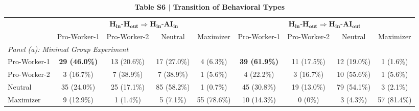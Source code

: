 \begin{table}[htbp]
\centering
\caption{\textbf{Table S6 $\vert$ Transition of Behavioral Types}}
\label{tab:transition_types}
\small
\setlength{\tabcolsep}{4pt}
\begin{tabular}{lcccccccc}
\toprule\toprule
 & \multicolumn{4}{c}{$\mathbf{H_{in}}$-$\mathbf{H_{out}} \Rightarrow \mathbf{H_{in}}$-$\mathbf{AI_{in}}$} & \multicolumn{4}{c}{$\mathbf{H_{in}}$-$\mathbf{H_{out}} \Rightarrow \mathbf{H_{in}}$-$\mathbf{AI_{out}}$} \\
\cmidrule(lr){2-5} \cmidrule(lr){6-9}
 & Pro-Worker-1 & Pro-Worker-2 & Neutral & Maximizer & Pro-Worker-1 & Pro-Worker-2 & Neutral & Maximizer \\
\midrule
\multicolumn{9}{l}{\emph{Panel (a): Minimal Group Experiment}} \\
\quad Pro-Worker-1 & \textbf{29 (46.0\%)} & 13 (20.6\%) & 17 (27.0\%) & 4 (6.3\%) & \textbf{39 (61.9\%)} & 11 (17.5\%) & 12 (19.0\%) & 1 (1.6\%) \\
\quad Pro-Worker-2 & 3 (16.7\%) & 7 (38.9\%) & 7 (38.9\%) & 1 (5.6\%) & 4 (22.2\%) & 3 (16.7\%) & 10 (55.6\%) & 1 (5.6\%) \\
\quad Neutral & 35 (24.0\%) & 25 (17.1\%) & 85 (58.2\%) & 1 (0.7\%) & 45 (30.8\%) & 19 (13.0\%) & 79 (54.1\%) & 3 (2.1\%) \\
\quad Maximizer & 9 (12.9\%) & 1 (1.4\%) & 5 (7.1\%) & 55 (78.6\%) & 10 (14.3\%) & 0 (0\%) & 3 (4.3\%) & 57 (81.4\%) \\
\bottomrule\bottomrule
\end{tabular}
\end{table}